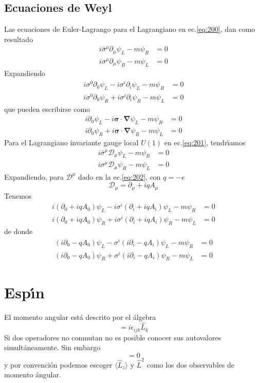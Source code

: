 \subsection{Ecuaciones de Weyl}
\label{sec:ecuaciones-de-weyl}
Las ecuaciones de Euler-Lagrango para el Lagrangiano en ec.\eqref{eq:200}, dan como resultado
\begin{align}
  i\bar{\sigma}^\mu\partial_\mu\psi_L -m\psi_R &=0\nonumber\\
  i{\sigma}^\mu\partial_\mu\psi_R -m\psi_L &=0
\end{align}
Expandiendo
\begin{align}
  \label{eq:209}
   i{\sigma}^0\partial_0\psi_L-i{\sigma}^i\partial_i\psi_L -m\psi_R &=0\nonumber\\
   i{\sigma}^0\partial_0\psi_R+i{\sigma}^i\partial_i\psi_R -m\psi_L &=0
\end{align}
que pueden escribirse como
\begin{align}
  \label{eq:207}
   i\partial_0\psi_L-i\boldsymbol{\sigma}\cdot\boldsymbol{\nabla}\psi_L -m\psi_R &=0\nonumber\\
   i\partial_0\psi_R+i\boldsymbol{\sigma}\cdot\boldsymbol{\nabla}\psi_R -m\psi_L &=0
\end{align}
Para el Lagrangiano invariante gauge local $U(1)$ en ec.\eqref{eq:201}, tendr\'\i amos
\begin{align}
  i\bar{\sigma}^\mu\mathcal{D}_\mu\psi_L -m\psi_R &=0\nonumber\\
  i{\sigma}^\mu\mathcal{D}_\mu\psi_R -m\psi_L &=0
\end{align}
Expandiendo, para $\mathcal{D}^\mu$ dado en la ec.\eqref{eq:202}, con $q=-e$
\begin{equation}
  \mathcal{D}_\mu=\partial_\mu+i q A_\mu
\end{equation}
Tenemos
\begin{align}
     i(\partial_0+i q A_0)\psi_L-i{\sigma}^i(\partial_i+i q A_i)\psi_L -m\psi_R &=0\nonumber\\
   i(\partial_0+i q A_0)\psi_R+i{\sigma}^i(\partial_i+i q A_i)\psi_R -m\psi_L &=0
\end{align}
de donde
\begin{align}
\label{eq:203}
     (i\partial_0- q A_0)\psi_L-{\sigma}^i(i\partial_i-q A_i)\psi_L -m\psi_R &=0\nonumber\\
   (i\partial_0-q A_0)\psi_R+{\sigma}^i(i\partial_i-q A_i)\psi_R -m\psi_L &=0
\end{align}
\section{Esp\'\i n}
\label{sec:espin}
El momento angular est\'a descrito por el \'algebra
\begin{equation}
  [\hat L_i,\hat L_j]=i\epsilon_{ijk}\hat L_k
\end{equation}
Si dos operadores no conmutan no es posible conocer sus autovalores simult\'aneamente. Sin embargo
\begin{equation}
  [\hat L_i,\hat{L}^2]=0
\end{equation}
y por convenci\'on podemos escoger $\langle\hat L_z\rangle$ y $\hat{L}^2$ como los dos observables de momento \'angular. 

